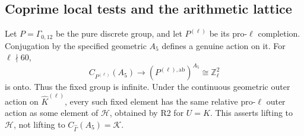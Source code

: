 \subsection*{Coprime local tests and the arithmetic lattice}

Let \(P=\Gamma_{0,12}\) be the pure discrete group, and let
\(P^{(\ell)}\) be its pro-\(\ell\) completion. Conjugation by
the specified geometric \(A_5\) defines a genuine action on it.
For \(\ell\nmid60\),
\[
 C_{P^{(\ell)}}(A_5)\longrightarrow
       (P^{(\ell),\mathrm{ab}})^{A_5}\cong\mathbb Z_\ell^2
\]
is onto. Thus the fixed group is infinite. Under the continuous
geometric outer action on \(\widehat K^{(\ell)}\), every such
fixed element has the same relative pro-\(\ell\) outer action
as some element of \(\mathcal H\), obtained by R2 for \(U=K\).
This asserts lifting to \(\mathcal H\), not lifting to
\(C_{\widehat\Gamma}(A_5)=\mathcal K\).
